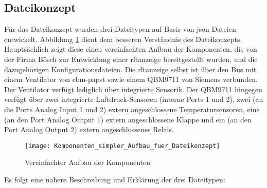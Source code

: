 \subsection{Dateikonzept} \label{json_config_files}
Für das Dateikonzept wurden drei Dateitypen auf Basis von \acs{json} Dateien entwickelt. Abbildung \ref{fig:vereinfachter_aufbau_dateikonzept} dient dem besseren Verständnis des Dateikonzepts. Hauptsächlich zeigt diese einen vereinfachten Aufbau der Komponenten, die von der Firma Bösch zur Entwicklung einer \acs{rltanzeige} bereitgestellt wurden, und die dazugehörigen Konfigurationsdateien. Die \acs{rltanzeige} selbst ist über den Bus mit einem Ventilator von ebm-papst sowie einem QBM9711 von Siemens verbunden. Der Ventilator verfügt lediglich über integrierte Sensorik. Der QBM9711 hingegen verfügt über zwei integrierte Luftdruck-Sensoren (interne Ports 1 und 2), zwei (an die Ports Analog Input 1 und 2) extern angeschlossene Temperatursensoren, eine (an den Port Analog Output 1) extern angeschlossene Klappe und ein (an den Port Analog Output 2) extern angeschlossenes Relais.


\begin{figure}[H]
	\centering
	\texttt{[image: Komponenten\_simpler\_Aufbau\_fuer\_Dateikonzept]}
	\caption{Vereinfachter Aufbau der Komponenten \label{fig:vereinfachter_aufbau_dateikonzept}}
\end{figure}

Es folgt eine nähere Beschreibung und Erklärung der drei Dateitypen:

